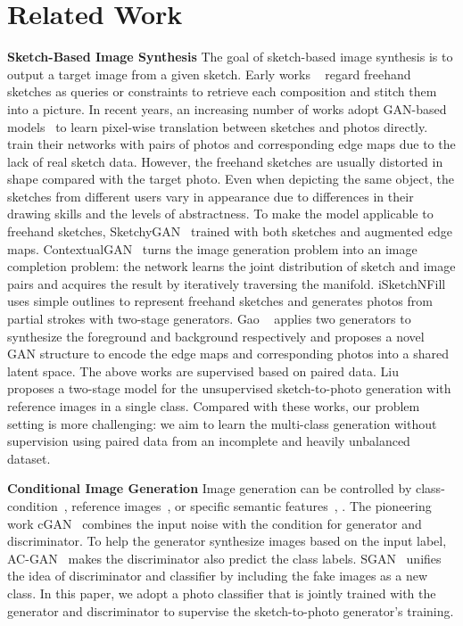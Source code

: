 \documentclass[10pt,twocolumn,letterpaper]{article}
\begin{document}
\section{Related Work}
\noindent \textbf{Sketch-Based Image Synthesis} The goal of sketch-based image synthesis is to output a target image from a given sketch. Early works ~\cite{chen2009sketch2photo,eitz2011photosketcher,chen2012poseshop} regard freehand sketches as queries or constraints to retrieve each composition and stitch them into a picture. In recent years, an increasing number of works adopt GAN-based models~\cite{goodfellow2014generative} to learn pixel-wise translation between sketches and photos directly. \cite{zhu2017unpaired,li2019linestofacephoto,chen2020deepfacedrawing} train their networks with pairs of photos and corresponding edge maps due to the lack of real sketch data. However, the freehand sketches are usually distorted in shape compared with the target photo. Even when depicting the same object, the sketches from different users vary in appearance due to differences in their drawing skills and the levels of abstractness. To make the model applicable to freehand sketches, SketchyGAN~\cite{chen2018sketchygan} trained with both sketches and augmented edge maps. ContextualGAN~\cite{lu2018image} turns the image generation problem into an image completion problem: the network learns the joint distribution of sketch and image pairs and acquires the result by iteratively traversing the manifold. iSketchNFill~\cite{ghosh2019interactive} uses simple outlines to represent freehand sketches and generates photos from partial strokes with two-stage generators. Gao \etal~\cite{gao2020sketchycoco} applies two generators to synthesize the foreground and background respectively and proposes a novel GAN structure to encode the edge maps and corresponding photos into a shared latent space. The above works are supervised based on paired data. Liu \etal~\cite{liu2019unpaired} proposes a two-stage model for the unsupervised sketch-to-photo generation with reference images in a single class. Compared with these works, our problem setting is more challenging: we aim to learn the multi-class generation without supervision using paired data from an incomplete and heavily unbalanced dataset.

\noindent \textbf{Conditional Image Generation} Image generation can be controlled by class-condition~\cite{ghosh2019interactive,gao2020sketchycoco}, reference images~\cite{lu2018image,liu2019few,liu2019unpaired}, or specific semantic features~\cite{johnson2018image,park2019semantic,zhu2020sean}, \etc. The pioneering work cGAN~\cite{mirza2014conditional} combines the input noise with the condition for generator and discriminator. To help the generator synthesize images based on the input label, AC-GAN~\cite{odena2017conditional} makes the discriminator also predict the class labels. SGAN~\cite{odena2016semi} unifies the idea of discriminator and classifier by including the fake images as a new class. In this paper, we adopt a photo classifier that is jointly trained with the generator and discriminator to supervise the sketch-to-photo generator's training.
\end{document}
